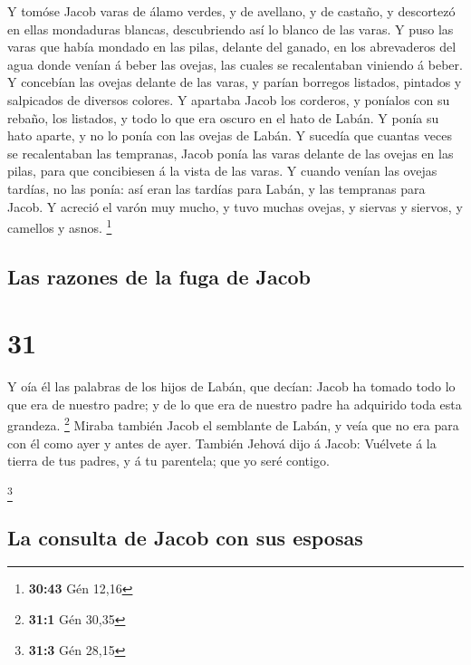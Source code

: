  Y tomóse Jacob varas de álamo verdes, y de avellano, y
de castaño, y descortezó en ellas mondaduras blancas, descubriendo así
lo blanco de las varas.  Y puso las varas que había
mondado en las pilas, delante del ganado, en los abrevaderos del agua
donde venían á beber las ovejas, las cuales se recalentaban viniendo á
beber.  Y concebían las ovejas delante de las varas, y
parían borregos listados, pintados y salpicados de diversos colores.
 Y apartaba Jacob los corderos, y poníalos con su rebaño,
los listados, y todo lo que era oscuro en el hato de Labán. Y ponía su
hato aparte, y no lo ponía con las ovejas de Labán.  Y
sucedía que cuantas veces se recalentaban las tempranas, Jacob ponía las
varas delante de las ovejas en las pilas, para que concibiesen á la
vista de las varas.  Y cuando venían las ovejas tardías,
no las ponía: así eran las tardías para Labán, y las tempranas para
Jacob.  Y acreció el varón muy mucho, y tuvo muchas
ovejas, y siervas y siervos, y camellos y asnos. \footnote{\textbf{30:43}
  Gén 12,16}

\hypertarget{las-razones-de-la-fuga-de-jacob}{%
\subsection{Las razones de la fuga de
Jacob}\label{las-razones-de-la-fuga-de-jacob}}

\hypertarget{section-30}{%
\section{31}\label{section-30}}

 Y oía él las palabras de los hijos de Labán, que decían:
Jacob ha tomado todo lo que era de nuestro padre; y de lo que era de
nuestro padre ha adquirido toda esta grandeza. \footnote{\textbf{31:1}
  Gén 30,35}  Miraba también Jacob el semblante de Labán,
y veía que no era para con él como ayer y antes de ayer. 
También Jehová dijo á Jacob: Vuélvete á la tierra de tus padres, y á tu
parentela; que yo seré contigo.

\footnote{\textbf{31:3} Gén 28,15}

\hypertarget{la-consulta-de-jacob-con-sus-esposas}{%
\subsection{La consulta de Jacob con sus
esposas}\label{la-consulta-de-jacob-con-sus-esposas}}

